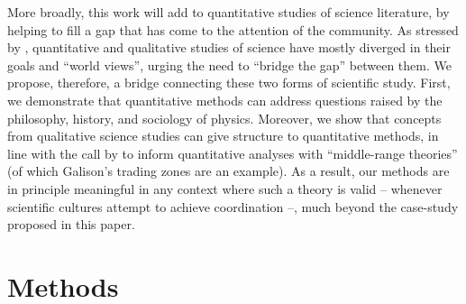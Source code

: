 \documentclass[smallextended]{svjour3}
\begin{document}





More broadly, this work will add to quantitative studies of science literature, by helping to fill a gap that has come to the attention of the community.  As stressed by \citet{Leydesdorff2020,Kang2020,Bowker2020}, quantitative and qualitative studies of science have mostly diverged in their goals and ``world views'', urging the need to ``bridge the gap'' between them. We propose, therefore, a bridge connecting these two forms of scientific study. First, we demonstrate that quantitative methods can address questions raised by the philosophy, history, and sociology of physics. Moreover, we show that concepts from qualitative 
 science studies can give structure to quantitative methods, in line with the call by \citealt{Heinze2020} to inform quantitative analyses with ``middle-range theories'' (of which Galison's trading zones are an example). As a result, our methods are in principle meaningful in any context where such a theory is valid -- whenever scientific cultures attempt to achieve coordination --, much beyond the case-study proposed in this paper.%

\section{Methods}\label{section:method}
\end{document}
